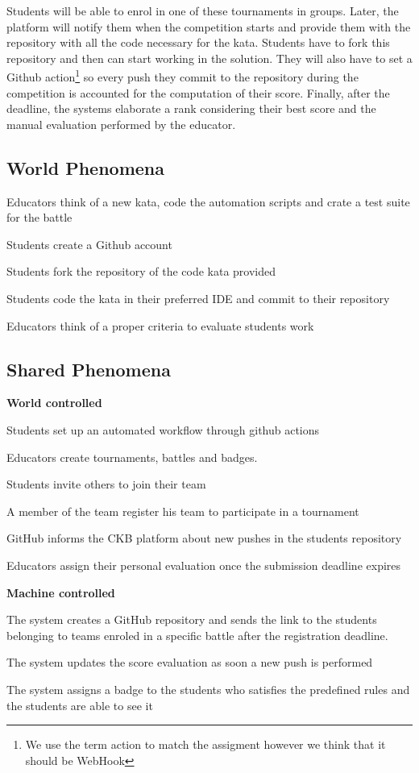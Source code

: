 Students will be able to enrol in one of these tournaments in groups. Later, the platform will notify them when the competition starts and provide them with the repository with all the code necessary for the kata. Students have to fork this repository and then can start working in the solution. They will also have to set a Github action\footnote{We use the term action to match the assigment however we think that it should be WebHook} so every push they commit to the repository during the competition is accounted for the computation of their score. Finally, after the deadline, the systems elaborate a rank considering their best score and the manual evaluation performed by the educator.
\subsection{World Phenomena}


\begin{enumerate}[label={[WP\arabic*]}]
    \item Educators think of a new kata, code the automation  scripts and crate a test suite for the battle
    \item Students create a Github account
    \item Students fork the repository of the code kata provided

    \item Students code the kata in their preferred IDE and commit to their repository
    \item Educators think of a proper criteria to evaluate students work
\end{enumerate}
\subsection{Shared Phenomena}
 \textbf{World controlled}
\begin{enumerate}[label={[SP\arabic*]}]
    \item Students set up an automated workflow through github actions
    \item Educators create tournaments, battles and badges. 
    \item Students invite others to join their team
    \item A member of the team register his team to participate in a tournament
    \item GitHub informs the CKB platform about new pushes in the students repository
    \item Educators assign their personal evaluation once the submission deadline expires
    
 \textbf{Machine controlled}

  \item The system creates a GitHub repository and sends the link to the students belonging to teams enroled in a specific battle after the registration deadline.
  \item The system updates the score evaluation as soon a new push is performed
  \item The system assigns a badge to the students who satisfies the predefined rules and the students are able to see it
\end{enumerate}

